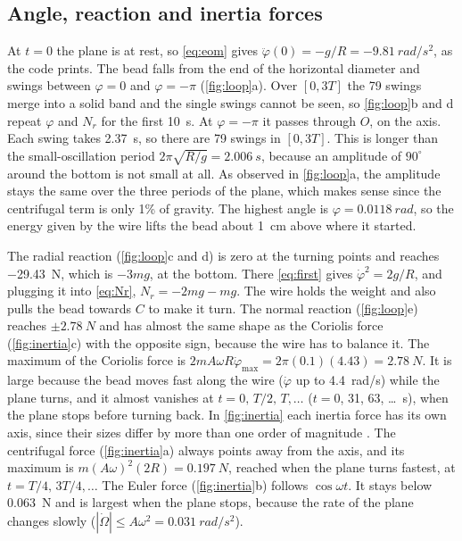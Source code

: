 \documentclass[11pt,a4paper]{article}
\newcommand{\dt}[1]{\dot{#1}}
\newcommand{\ddt}[1]{\ddot{#1}}
\begin{document}
\subsection{Angle, reaction and inertia forces}
At $t=0$ the plane is at rest, so \cref{eq:eom} gives $\ddt\varphi(0)=-g/R=\SI{-9.81}{rad/s^2}$, as the code prints. The bead falls from the end of the horizontal diameter and swings between $\varphi=0$ and $\varphi=-\pi$ (\cref{fig:loop}a). Over $[0,3T]$ the 79 swings merge into a solid band and the single swings cannot be seen, so \cref{fig:loop}b and d repeat $\varphi$ and $N_r$ for the first \SI{10}{s}. At $\varphi=-\pi$ it passes through $O$, on the axis. Each swing takes \SI{2.37}{s}, so there are 79 swings in $[0,3T]$. This is longer than the small-oscillation period $2\pi\sqrt{R/g}=\SI{2.006}{s}$, because an amplitude of $90^\circ$ around the bottom is not small at all. As observed in \cref{fig:loop}a, the amplitude stays the same over the three periods of the plane, which makes sense since the centrifugal term is only 1\% of gravity. The highest angle is $\varphi=\SI{0.0118}{rad}$, so the energy given by the wire lifts the bead about \SI{1}{cm} above where it started.

The radial reaction (\cref{fig:loop}c and d) is zero at the turning points and reaches \SI{-29.43}{N}, which is $-3mg$, at the bottom. There \cref{eq:first} gives $\dt\varphi^2=2g/R$, and plugging it into \cref{eq:Nr}, $N_r=-2mg-mg$. The wire holds the weight and also pulls the bead towards $C$ to make it turn. The normal reaction (\cref{fig:loop}e) reaches $\pm\SI{2.78}{N}$ and has almost the same shape as the Coriolis force (\cref{fig:inertia}c) with the opposite sign, because the wire has to balance it. The maximum of the Coriolis force is $2mA\omega R\dt\varphi_{\max}=2\pi(0.1)(4.43)=\SI{2.78}{N}$. It is large because the bead moves fast along the wire ($\dt\varphi$ up to \SI{4.4}{rad/s}) while the plane turns, and it almost vanishes at $t=0,\,T/2,\,T,\dots$ ($t=0$, 31, 63, \dots\ s), when the plane stops before turning back. In \cref{fig:inertia} each inertia force has its own axis, since their sizes differ by more than one order of magnitude \cite{guidelines}. The centrifugal force (\cref{fig:inertia}a) always points away from the axis, and its maximum is $m(A\omega)^2(2R)=\SI{0.197}{N}$, reached when the plane turns fastest, at $t=T/4,\,3T/4,\dots$ The Euler force (\cref{fig:inertia}b) follows $\cos\omega t$. It stays below \SI{0.063}{N} and is largest when the plane stops, because the rate of the plane changes slowly ($|\dt\Omega|\le A\omega^2=\SI{0.031}{rad/s^2}$).
\end{document}
